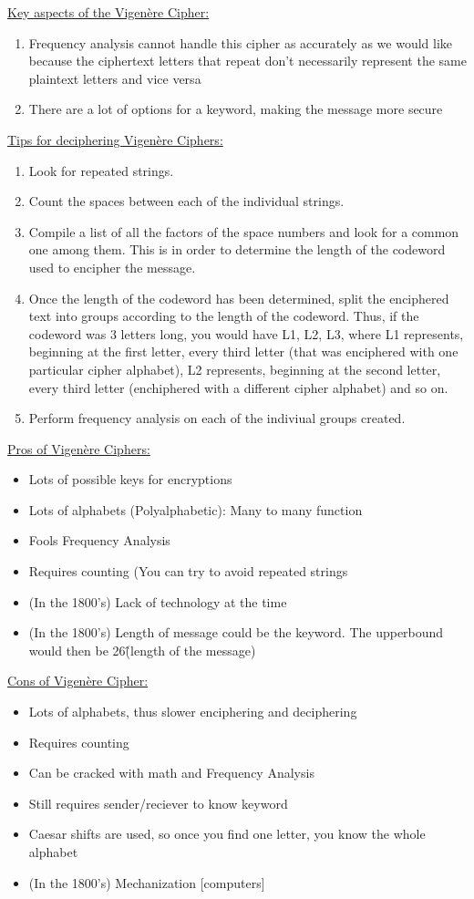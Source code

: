 \underline{Key aspects of the Vigen\`ere Cipher:}
\begin{enumerate}
\item Frequency analysis cannot handle this cipher as accurately as we would like because the ciphertext letters that repeat don't necessarily represent the same plaintext letters and vice versa
\item There are a lot of options for a keyword, making the message more secure
\end{enumerate}

\underline{Tips for deciphering Vigen\`ere Ciphers:}
\begin{enumerate}
\item Look for repeated strings.
\item Count the spaces between each of the individual strings.
\item Compile a list of all the factors of the space numbers and look for a common one among them.  This is in order to determine the length of the codeword used to encipher the message.
\item Once the length of the codeword has been determined, split the enciphered text into groups according to the length of the codeword.  Thus, if the codeword was 3 letters long, you would have L1, L2, L3, where L1 represents, beginning at the first letter, every third letter (that was enciphered with one particular cipher alphabet), L2 represents, beginning at the second letter, every third letter (enchiphered with a different cipher alphabet) and so on.
\item Perform frequency analysis on each of the indiviual groups created.
\end{enumerate}

\underline{Pros of Vigen\`ere Ciphers:}
\begin{itemize}
\item Lots of possible keys for encryptions
\item Lots of alphabets (Polyalphabetic): Many to many function
\item Fools Frequency Analysis
\item Requires counting (You can try to avoid repeated strings
\item (In the 1800's) Lack of technology at the time
\item (In the 1800's) Length of message could be the keyword.  The upperbound would then be 26\^(length of the message)
\end{itemize}

\underline{Cons of Vigen\`ere Cipher:}
\begin{itemize}
\item Lots of alphabets, thus slower enciphering and deciphering
\item Requires counting
\item Can be cracked with math and Frequency Analysis
\item Still requires sender/reciever to know keyword
\item Caesar shifts are used, so once you find one letter, you know the whole alphabet
\item (In the 1800's) Mechanization [computers]
\end{itemize}

